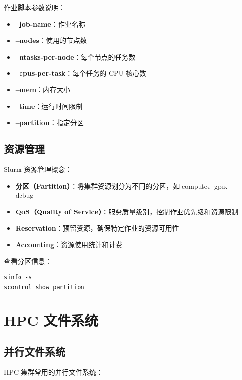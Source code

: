 \documentclass[12pt,UTF8]{ctexbook}
\begin{document}
作业脚本参数说明：
\begin{itemize}
    \item \textbf{--job-name}：作业名称
    \item \textbf{--nodes}：使用的节点数
    \item \textbf{--ntasks-per-node}：每个节点的任务数
    \item \textbf{--cpus-per-task}：每个任务的 CPU 核心数
    \item \textbf{--mem}：内存大小
    \item \textbf{--time}：运行时间限制
    \item \textbf{--partition}：指定分区
\end{itemize}

\section{资源管理}
\label{sec:resource_management}

Slurm 资源管理概念：
\begin{itemize}
    \item \textbf{分区（Partition）}：将集群资源划分为不同的分区，如 compute、gpu、debug
    \item \textbf{QoS（Quality of Service）}：服务质量级别，控制作业优先级和资源限制
    \item \textbf{Reservation}：预留资源，确保特定作业的资源可用性
    \item \textbf{Accounting}：资源使用统计和计费
\end{itemize}

查看分区信息：
\begin{verbatim}
sinfo -s
scontrol show partition
\end{verbatim}

\chapter{HPC 文件系统}
\label{chap:hpc_file_system}

\section{并行文件系统}
\label{sec:parallel_file_system}

HPC 集群常用的并行文件系统：
\end{document}
